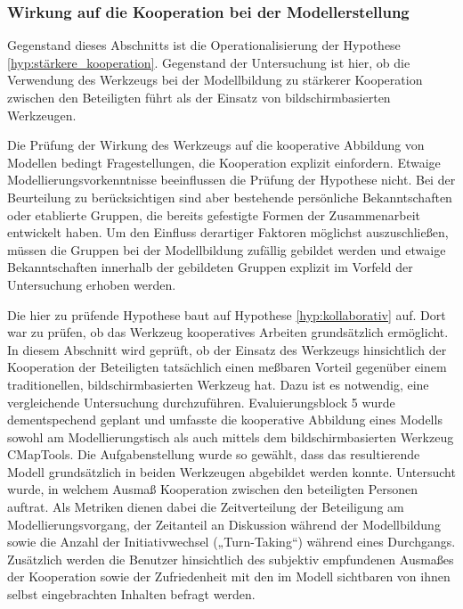 
\subsubsection{Wirkung auf die Kooperation bei der Modellerstellung} %
\label{ssub:wirkung_auf_die_kooperation_bei_der_modellerstellung}

Gegenstand dieses Abschnitts ist die Operationalisierung der Hypothese \ref{hyp:stärkere_kooperation}. Gegenstand der Untersuchung ist hier, ob die Verwendung des Werkzeugs bei der Modellbildung zu stärkerer Kooperation zwischen den Beteiligten führt als der Einsatz von bildschirmbasierten Werkzeugen.

Die Prüfung der Wirkung des Werkzeugs auf die kooperative Abbildung von Modellen bedingt Fragestellungen, die Kooperation explizit einfordern. Etwaige Modellierungsvorkenntnisse beeinflussen die Prüfung der Hypothese nicht. Bei der Beurteilung zu berücksichtigen sind aber bestehende persönliche Bekanntschaften oder etablierte Gruppen, die bereits gefestigte Formen der Zusammenarbeit entwickelt haben. Um den Einfluss derartiger Faktoren möglichst auszuschließen, müssen die Gruppen bei der Modellbildung zufällig gebildet werden und etwaige Bekanntschaften innerhalb der gebildeten Gruppen explizit im Vorfeld der Untersuchung erhoben werden.

Die hier zu prüfende Hypothese baut auf Hypothese \ref{hyp:kollaborativ} auf. Dort war zu prüfen, ob das Werkzeug kooperatives Arbeiten grundsätzlich ermöglicht. In diesem Abschnitt wird geprüft, ob der Einsatz des Werkzeugs hinsichtlich der Kooperation der Beteiligten tatsächlich einen meßbaren Vorteil gegenüber einem traditionellen, bildschirmbasierten Werkzeug hat. Dazu ist es notwendig, eine vergleichende Untersuchung durchzuführen. Evaluierungsblock 5 wurde dementspechend geplant und umfasste die kooperative Abbildung eines Modells sowohl am Modellierungstisch als auch mittels dem bildschirmbasierten Werkzeug CMapTools. Die Aufgabenstellung wurde so gewählt, dass das resultierende Modell grundsätzlich in beiden Werkzeugen abgebildet werden konnte. Untersucht wurde, in welchem Ausmaß Kooperation zwischen den beteiligten Personen auftrat. Als Metriken dienen dabei die Zeitverteilung der Beteiligung am Modellierungsvorgang, der Zeitanteil an Diskussion während der Modellbildung sowie die Anzahl der Initiativwechsel („Turn-Taking“) während eines Durchgangs. Zusätzlich werden die Benutzer hinsichtlich des subjektiv empfundenen Ausmaßes der Kooperation sowie der Zufriedenheit mit den im Modell sichtbaren von ihnen selbst eingebrachten Inhalten befragt werden.

